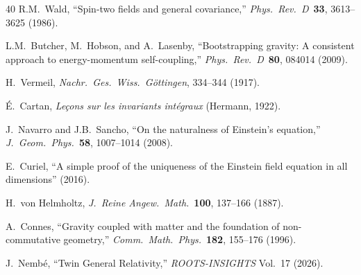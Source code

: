 \documentclass[12pt]{article}
\theoremstyle{plain}
\theoremstyle{definition}
\theoremstyle{remark}
\begin{document}
\begin{thebibliography}{40}
 R.M.~Wald, ``Spin-two fields and general covariance,'' \emph{Phys.\ Rev.\ D}\ \textbf{33}, 3613--3625 (1986).

 L.M.~Butcher, M.~Hobson, and A.~Lasenby, ``Bootstrapping gravity: A consistent approach to energy-momentum self-coupling,'' \emph{Phys.\ Rev.\ D}\ \textbf{80}, 084014 (2009).

 H.~Vermeil, \emph{Nachr.\ Ges.\ Wiss.\ G\"ottingen}, 334--344 (1917).

 \'E.~Cartan, \emph{Le\c{c}ons sur les invariants int\'egraux} (Hermann, 1922).

 J.~Navarro and J.B.~Sancho, ``On the naturalness of Einstein's equation,'' \emph{J.\ Geom.\ Phys.}\ \textbf{58}, 1007--1014 (2008).

 E.~Curiel, ``A simple proof of the uniqueness of the Einstein field equation in all dimensions'' (2016).

 H.~von Helmholtz, \emph{J.\ Reine Angew.\ Math.}\ \textbf{100}, 137--166 (1887).

 A.~Connes, ``Gravity coupled with matter and the foundation of non-commutative geometry,'' \emph{Comm.\ Math.\ Phys.}\ \textbf{182}, 155--176 (1996).

 J.~Nemb\'e, ``Twin General Relativity,'' \emph{ROOTS-INSIGHTS} Vol.~17 (2026).

\end{thebibliography}
\end{document}
